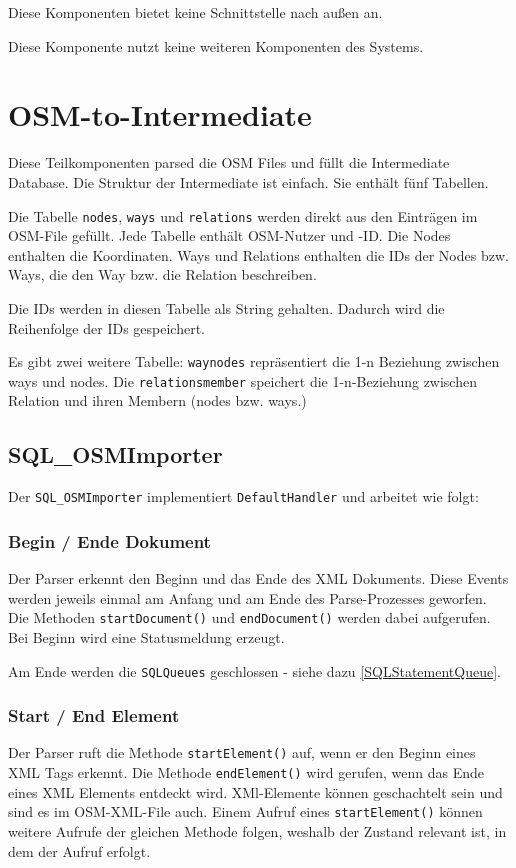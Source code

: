 Diese Komponenten bietet keine Schnittstelle nach außen an.

Diese Komponente nutzt keine weiteren Komponenten des Systems.

\section{OSM-to-Intermediate}
Diese Teilkomponenten parsed die OSM Files und füllt die Intermediate Database.
Die Struktur der Intermediate ist einfach. Sie enthält fünf Tabellen.

Die Tabelle {\tt nodes}, {\tt ways} und {\tt relations} werden direkt aus
den Einträgen im OSM-File gefüllt. Jede Tabelle enthält OSM-Nutzer und -ID.
Die Nodes enthalten die Koordinaten. Ways und Relations enthalten die IDs
der Nodes bzw. Ways, die den Way bzw. die Relation beschreiben.

Die IDs werden in diesen Tabelle als String gehalten. Dadurch wird die
Reihenfolge der IDs gespeichert.

Es gibt zwei weitere Tabelle: {\tt waynodes} repräsentiert die 1-n Beziehung
zwischen ways und nodes. Die {\tt relationsmember} speichert die 1-n-Beziehung 
zwischen Relation und ihren Membern (nodes bzw. ways.)

\subsection{SQL\_OSMImporter}
Der {\tt SQL\_OSMImporter} implementiert {\tt DefaultHandler} und arbeitet wie folgt:

\subsubsection{Begin / Ende Dokument}
Der Parser erkennt den Beginn und das Ende des XML Dokuments. Diese Events werden jeweils
einmal am Anfang und am Ende des Parse-Prozesses geworfen. Die Methoden {\tt startDocument()}
und {\tt endDocument()} werden dabei aufgerufen. Bei Beginn wird eine Statusmeldung erzeugt.

Am Ende werden die {\tt SQLQueues} geschlossen - siehe dazu \ref{SQLStatementQueue}.

\subsubsection{Start / End Element}
Der Parser ruft die Methode {\tt startElement()} auf, wenn er den Beginn eines XML
Tags erkennt. Die Methode {\tt endElement()} wird gerufen, wenn das Ende eines
XML Elements entdeckt wird. XMl-Elemente können geschachtelt sein und sind es im
OSM-XML-File auch. Einem Aufruf eines {\tt startElement()} können weitere Aufrufe
der gleichen Methode folgen, weshalb der Zustand relevant ist, in dem der Aufruf erfolgt.

